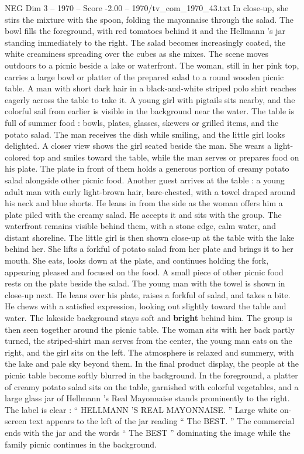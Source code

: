 \begin{textsample}{NEG Dim 3 – 1970 – Score -2.00 – 1970/tv\_com\_1970\_43.txt}
In close-up, she stirs the mixture with the spoon, folding the mayonnaise through the salad.
The bowl fills the foreground, with red tomatoes behind it and the Hellmann ’s jar standing immediately to the right.
The salad becomes increasingly coated, the white creaminess spreading over the cubes as she mixes.
The scene moves outdoors to a picnic beside a lake or waterfront.
The woman, still in her pink top, carries a large bowl or platter of the prepared salad to a round wooden picnic table.
A man with short dark hair in a black-and-white striped polo shirt reaches eagerly across the table to take it.
A young girl with pigtails sits nearby, and the colorful sail from earlier is visible in the background near the water.
The table is full of summer food : bowls, plates, glasses, skewers or grilled items, and the potato salad.
The man receives the dish while smiling, and the little girl looks delighted.
A closer view shows the girl seated beside the man.
She wears a light-colored top and smiles toward the table, while the man serves or prepares food on his plate.
The plate in front of them holds a generous portion of creamy potato salad alongside other picnic food.
Another guest arrives at the table : a young adult man with curly light-brown hair, bare-chested, with a towel draped around his neck and blue shorts.
He leans in from the side as the woman offers him a plate piled with the creamy salad.
He accepts it and sits with the group.
The waterfront remains visible behind them, with a stone edge, calm water, and distant shoreline.
The little girl is then shown close-up at the table with the lake behind her.
She lifts a forkful of potato salad from her plate and brings it to her mouth.
She eats, looks down at the plate, and continues holding the fork, appearing pleased and focused on the food.
A small piece of other picnic food rests on the plate beside the salad.
The young man with the towel is shown in close-up next.
He leans over his plate, raises a forkful of salad, and takes a bite.
He chews with a satisfied expression, looking out slightly toward the table and water.
The lakeside background stays soft and \textbf{bright} behind him.
The group is then seen together around the picnic table.
The woman sits with her back partly turned, the striped-shirt man serves from the center, the young man eats on the right, and the girl sits on the left.
The atmosphere is relaxed and summery, with the lake and pale sky beyond them.
In the final product display, the people at the picnic table become softly blurred in the background.
In the foreground, a platter of creamy potato salad sits on the table, garnished with colorful vegetables, and a large glass jar of Hellmann ’s Real Mayonnaise stands prominently to the right.
The label is clear : “ HELLMANN ’S REAL MAYONNAISE. ” Large white on-screen text appears to the left of the jar reading “ The BEST. ” The commercial ends with the jar and the words “ The BEST ” dominating the image while the family picnic continues in the background.

\end{textsample}
